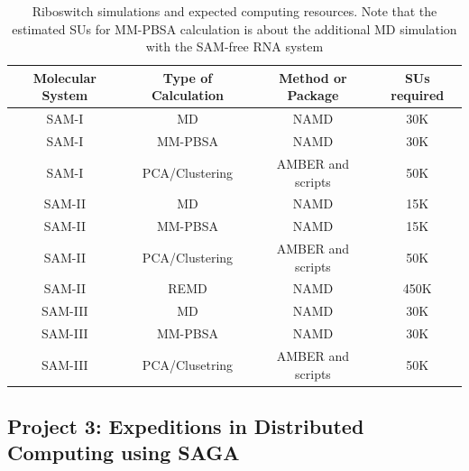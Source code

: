 \documentclass[a4paper,10pt]{article}
\begin{document}
\begin{table}[!h]
\begin{center}
  \caption{Riboswitch simulations and expected computing resources. Note that the estimated SUs for MM-PBSA calculation is about the additional MD simulation with the SAM-free RNA system}
\label{table:systems}
\begin{tabular}{| c | c | c | c |}
\hline
Molecular System & Type of Calculation &   Method or Package  &   SUs required \\
\hline
SAM-I & MD &  NAMD &  30K\\
SAM-I & MM-PBSA & NAMD & 30K \\
SAM-I & PCA/Clustering &  AMBER and scripts &  50K\\
SAM-II &MD &  NAMD &  15K\\
SAM-II & MM-PBSA & NAMD & 15K \\
SAM-II & PCA/Clustering & AMBER and scripts & 50K \\
SAM-II & REMD &  NAMD &  450K\\
SAM-III &MD &  NAMD &  30K\\
SAM-III & MM-PBSA & NAMD & 30K \\
SAM-III & PCA/Clusetring & AMBER and scripts & 50K \\
\hline
\end{tabular}
\end{center}
\end{table}


\subsection*{Project 3: Expeditions in Distributed Computing using SAGA}

\end{document}
